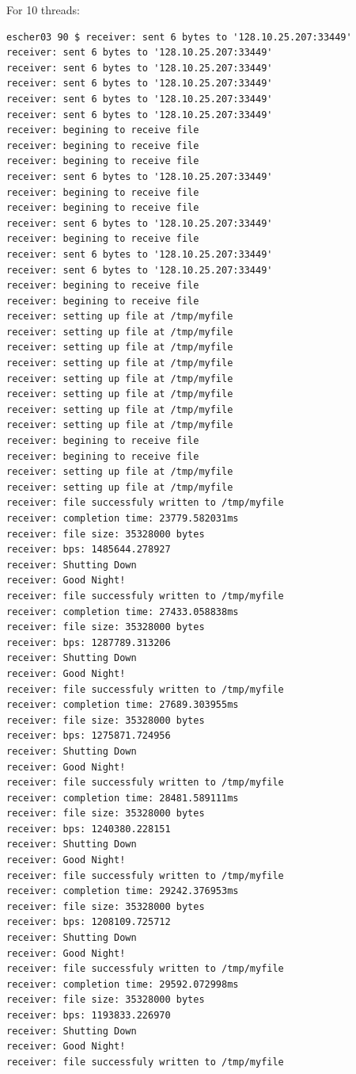 \documentclass[paper=a4, fontsize=11pt]{scrartcl}
\numberwithin{equation}{section}		%
\numberwithin{figure}{section}			%
\numberwithin{table}{section}				%
\begin{document}
For 10 threads:
\begin{verbatim}
escher03 90 $ receiver: sent 6 bytes to '128.10.25.207:33449'
receiver: sent 6 bytes to '128.10.25.207:33449'
receiver: sent 6 bytes to '128.10.25.207:33449'
receiver: sent 6 bytes to '128.10.25.207:33449'
receiver: sent 6 bytes to '128.10.25.207:33449'
receiver: sent 6 bytes to '128.10.25.207:33449'
receiver: begining to receive file
receiver: begining to receive file
receiver: begining to receive file
receiver: sent 6 bytes to '128.10.25.207:33449'
receiver: begining to receive file
receiver: begining to receive file
receiver: sent 6 bytes to '128.10.25.207:33449'
receiver: begining to receive file
receiver: sent 6 bytes to '128.10.25.207:33449'
receiver: sent 6 bytes to '128.10.25.207:33449'
receiver: begining to receive file
receiver: begining to receive file
receiver: setting up file at /tmp/myfile
receiver: setting up file at /tmp/myfile
receiver: setting up file at /tmp/myfile
receiver: setting up file at /tmp/myfile
receiver: setting up file at /tmp/myfile
receiver: setting up file at /tmp/myfile
receiver: setting up file at /tmp/myfile
receiver: setting up file at /tmp/myfile
receiver: begining to receive file
receiver: begining to receive file
receiver: setting up file at /tmp/myfile
receiver: setting up file at /tmp/myfile
receiver: file successfuly written to /tmp/myfile
receiver: completion time: 23779.582031ms
receiver: file size: 35328000 bytes
receiver: bps: 1485644.278927
receiver: Shutting Down
receiver: Good Night!
receiver: file successfuly written to /tmp/myfile
receiver: completion time: 27433.058838ms
receiver: file size: 35328000 bytes
receiver: bps: 1287789.313206
receiver: Shutting Down
receiver: Good Night!
receiver: file successfuly written to /tmp/myfile
receiver: completion time: 27689.303955ms
receiver: file size: 35328000 bytes
receiver: bps: 1275871.724956
receiver: Shutting Down
receiver: Good Night!
receiver: file successfuly written to /tmp/myfile
receiver: completion time: 28481.589111ms
receiver: file size: 35328000 bytes
receiver: bps: 1240380.228151
receiver: Shutting Down
receiver: Good Night!
receiver: file successfuly written to /tmp/myfile
receiver: completion time: 29242.376953ms
receiver: file size: 35328000 bytes
receiver: bps: 1208109.725712
receiver: Shutting Down
receiver: Good Night!
receiver: file successfuly written to /tmp/myfile
receiver: completion time: 29592.072998ms
receiver: file size: 35328000 bytes
receiver: bps: 1193833.226970
receiver: Shutting Down
receiver: Good Night!
receiver: file successfuly written to /tmp/myfile

\end{verbatim}
\end{document}
